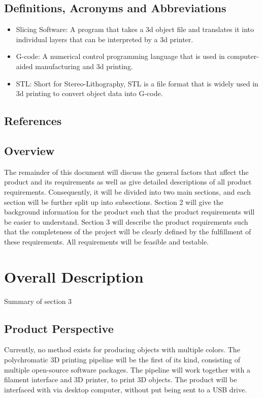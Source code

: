 \documentclass[letterpaper, onecolumn, draftclsnofoot, 10pt, compsoc]{IEEEtran}
\begin{document}
\subsection{Definitions, Acronyms and Abbreviations} %
  \begin{itemize}
  	\item Slicing Software: A program that takes a 3d object file and translates it into individual layers that can be interpreted by a 3d printer.
    \item G-code: A numerical control programming language that is used in computer-aided manufacturing and 3d printing.
    \item STL: Short for Stereo-Lithography, STL is a file format that is widely used in 3d printing to convert object data into G-code.
  \end{itemize}

\subsection{References} %

\subsection{Overview} %
The remainder of this document will discuss the general factors that affect the product and its requirements as well as give detailed descriptions of all product requirements. 
Consequently, it will be divided into two main sections, and each section will be further split up into subsections.
Section 2 will give the background information for the product such that the product requirements will be easier to understand.
Section 3 will describe the product requirements such that the completeness of the project will be clearly defined by the fulfillment of these requirements.
All requirements will be feasible and testable.

\section{Overall Description}
Summary of section 3

\subsection{Product Perspective} %
Currently, no method exists for producing objects with multiple colors.
The polychromatic 3D printing pipeline will be the first of its kind, consisting of multiple open-source software packages. 
The pipeline will work together with a filament interface and 3D printer, to print 3D objects. 
The product will be interfaced with via desktop computer, without put being sent to a USB drive.
\end{document}
